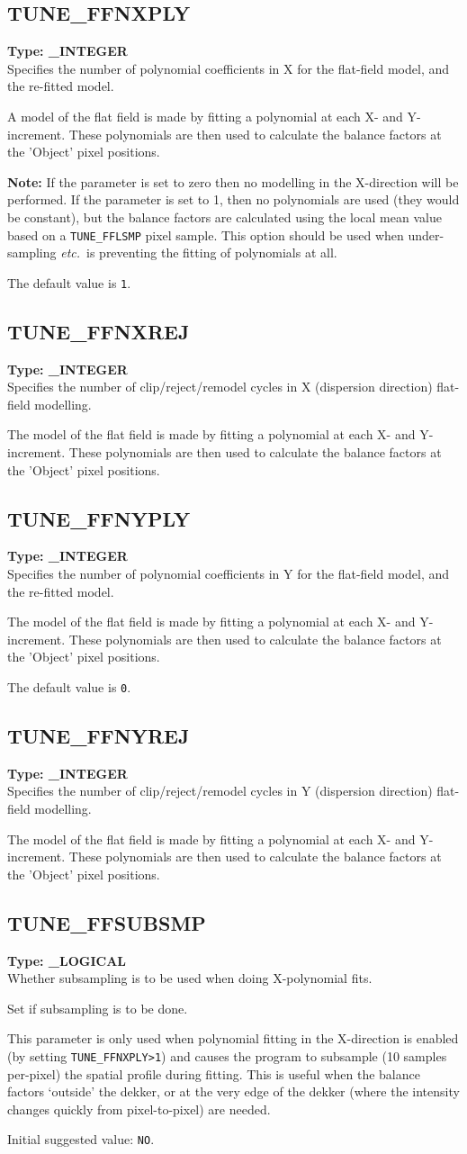 \documentclass[11pt,twoside]{article}
\makeatletter
\newcommand{\htmlref}[2]{#1}
\newcommand{\xlabel}[1]{}
\newcommand{\indexcmdname}[1]{\index{#1@\protect\cmdname{#1}}}
\renewcommand{\indexcmdname}[1]{}
\newcommand{\cmdname}{\begingroup \catcode`\_=12 \realcmdname}
\newcommand{\realcmdname}[1]{\endgroup\texttt{#1}}
\newcommand{\echparameter}[4]
{
\item [#1 = #3] \mbox{}\label{par_#2}\indexcmdname{#2}
\\
#4
}
\renewcommand{\echparameter}[4]
{
  \subsection{\xlabel{par_#2}\label{par_#2}{\bf #1}}
  {\bf Type: #3}\\
#4
}
\makeatother
\begin{document}
\echparameter{TUNE\_FFNXPLY}{TUNE_FFNXPLY}{
 \_INTEGER
}{
 Specifies the number of polynomial coefficients in X for the
 flat-field model, and the re-fitted model.

 A model of the flat field is made by fitting a polynomial at
 each X- and Y-increment.  These polynomials are then used to
 calculate the balance factors at the 'Object' pixel positions.

 {\bf Note:} If the parameter is set to zero then no modelling in the
 X-direction will be performed.  If the parameter is set to 1, then
 no polynomials are used (they would be constant), but the balance
 factors are calculated using the local mean value based on a
 \htmlref{{\tt TUNE\_FFLSMP}}{par_TUNE_FFLSMP} pixel sample.
 This option should be used when
 under-sampling {\it etc.}\ is preventing the fitting of polynomials at all.

 The default value is \texttt{1}.
}

\echparameter{TUNE\_FFNXREJ}{TUNE_FFNXREJ}{
 \_INTEGER
}{
 Specifies the number of clip/reject/remodel cycles in X
 (dispersion direction) flat-field modelling.

 The model of the flat field is made by fitting a polynomial at each
 X- and Y-increment.  These polynomials are then used to calculate
 the balance factors at the 'Object' pixel positions.
}

\echparameter{TUNE\_FFNYPLY}{TUNE_FFNYPLY}{
 \_INTEGER
}{
 Specifies the number of polynomial coefficients in Y for the
 flat-field model, and the re-fitted model.

 The model of the flat field is made by fitting a polynomial at each
 X- and Y-increment.  These polynomials are then used to calculate the
 balance factors at the 'Object' pixel positions.

 The default value is \texttt{0}.
}

\echparameter{TUNE\_FFNYREJ}{TUNE_FFNYREJ}{
 \_INTEGER
}{
 Specifies the number of clip/reject/remodel cycles in Y
 (dispersion direction) flat-field modelling.

 The model of the flat field is made by fitting a polynomial at each
 X- and Y-increment.  These polynomials are then used to calculate
 the balance factors at the 'Object' pixel positions.
}

\echparameter{TUNE\_FFSUBSMP}{TUNE_FFSUBSMP}{
 \_LOGICAL
}{
 Whether subsampling is to be used when doing X-polynomial fits.

 Set if subsampling is to be done.

 This parameter is only used when polynomial fitting in the
 X-direction is enabled (by setting
 \htmlref{{\tt TUNE\_FFNXPLY>1}}{par_TUNE_FFNXPLY}) and causes the program
 to subsample (10 samples per-pixel) the spatial profile during
 fitting.  This is useful when the balance factors `outside' the dekker,
 or at the very edge of the dekker (where the intensity changes
 quickly from pixel-to-pixel) are needed.

 Initial suggested value: \texttt{NO}.
}
\end{document}

